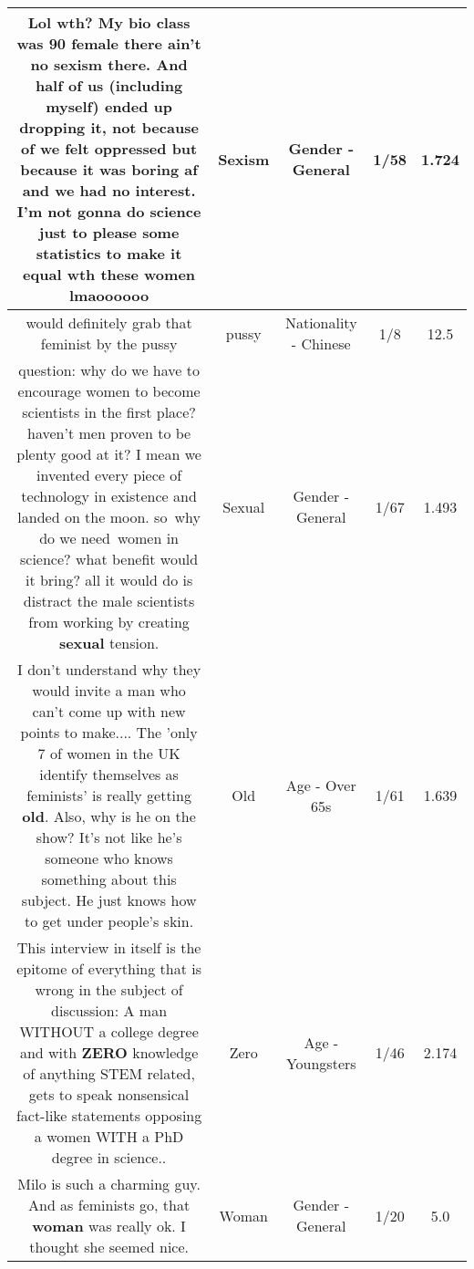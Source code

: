 \documentclass[11pt]{article}
\newlength\mylength
\begin{document}
\begin{center}
\begin{longtable}{|C{.65\mylength}|C{.30\mylength}|C{.12\mylength}|C{.12\mylength}|C{.12\mylength}|}
  \small Lol wth? My bio class was 90 female there ain't no \textbf{sexism} there. And half of us (including myself) ended up dropping it, not because of we felt oppressed but because it was boring af and we had no interest. I'm not gonna do science just to please some statistics to make it equal wth these women lmaoooooo\normalsize   & Sexism & Gender - General & 1/58 & 1.724 \\  \hline
  \small would definitely grab that feminist by the pussy\normalsize   & pussy & Nationality - Chinese & 1/8 & 12.5 \\  \hline
  \small question: why do we have to encourage women to become scientists in the first place? haven't men proven to be plenty good at it? I mean we invented every piece of technology in existence and landed on the moon. so why do we need women in science? what benefit would it bring? all it would do is distract the male scientists from working by creating \textbf{sexual} tension.\normalsize   & Sexual & Gender - General & 1/67 & 1.493 \\  \hline
  \small I don't understand why they would invite a man who can't come up with new points to make.... The 'only 7 of women in the UK identify themselves as feminists' is really getting \textbf{old}. Also, why is he on the show? It's not like he's someone who knows something about this subject. He just knows how to get under people's skin.\normalsize   & Old & Age - Over 65s & 1/61 & 1.639 \\  \hline
  \small This interview in itself is the epitome of everything that is wrong in the subject of discussion: A man WITHOUT a college degree and with \textbf{ZERO} knowledge of anything STEM related, gets to speak nonsensical fact-like statements opposing a women WITH a PhD degree in science..\normalsize   & Zero & Age - Youngsters & 1/46 & 2.174 \\  \hline
  \small Milo is such a charming guy. And as feminists go, that \textbf{woman} was really ok. I thought she seemed nice.\normalsize   & Woman & Gender - General & 1/20 & 5.0 \\  \hline

\end{longtable}
\end{center}
\end{document}

